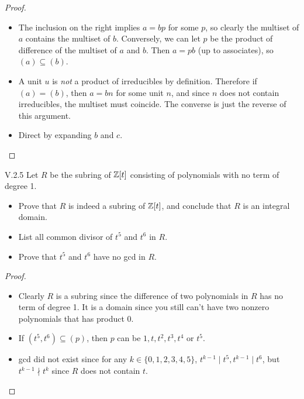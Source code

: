 \begin{proof}
\begin{itemize}	
    \setlength\itemsep{0pt}
    \item The inclusion on the right implies $a = bp$ for some $p$, so clearly the multiset of $a$ contains the multiset of $b$. Conversely, we can let $p$ be the product of difference of the multiset of $a$ and $b$. Then $a = pb$ (up to associates), so $(a)\subseteq(b)$.
    \item A unit $u$ is \emph{not} a product of irreducibles by definition. Therefore if $(a) = (b)$, then $a = bn$ for some unit $n$, and since $n$ does not contain irreducibles, the multiset must coincide. The converse is just the reverse of this argument.
    \item Direct by expanding $b$ and $c$.
\end{itemize}
\end{proof}

\begin{problem}{V.2.5}
Let $R$ be the subring of $\mathbb{Z}[t]$ consisting of polynomials with no term of degree 1.
\begin{itemize}
    \setlength\itemsep{0pt}
    \item Prove that $R$ is indeed a subring of $\mathbb{Z}[t]$, and conclude that $R$ is an integral domain.
    \item List all common divisor of $t^5$ and $t^6$ in $R$.
    \item Prove that $t^5$ and $t^6$ have no gcd in $R$.
\end{itemize}
\end{problem}
\begin{proof}
\begin{itemize}
    \setlength\itemsep{0pt}
    \item Clearly $R$ is a subring since the difference of two polynomials in $R$ has no term of degree 1. It is a domain since you still can't have two nonzero polynomials that has product $0$.
    \item If $(t^5, t^6) \subseteq (p)$, then $p$ can be $1, t, t^2, t^3, t^4$ or $t^5$.
    \item gcd did not exist since for any $k \in \{0,1,2,3,4,5\}$, $t^{k-1} \mid t^5, t^{k-1} \mid t^6$, but $t^{k-1} \nmid t^k$ since $R$ does not contain $t$.
\end{itemize}
\end{proof}

